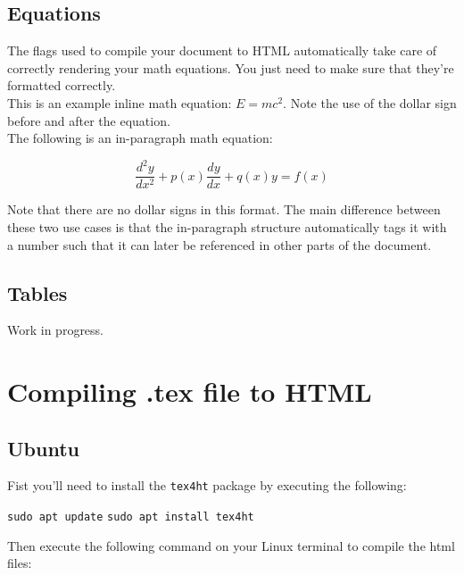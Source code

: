 \documentclass[lang=en]{article}
\newcommand{\code}[1]{\colorbox{light-gray}{\texttt{#1}}}
\begin{document}
\subsection{Equations}

The flags used to compile your document to HTML automatically take care of
correctly rendering your math equations. You just need to make sure that they're
formatted correctly. \\

This is an example inline math equation: $E=mc^2$. Note the use of the dollar
sign before and after the equation. \\

The following is an in-paragraph math equation:

\begin{equation}
  \frac{d^2y}{dx^2} + p(x) \frac{dy}{dx} + q(x)y = f(x)
\end{equation}

Note that there are no dollar signs in this format. The main difference between
these two use cases is that the in-paragraph structure automatically tags it
with a number such that it can later be referenced in other parts of the
document.


\subsection{Tables}

Work in progress.


\section{Compiling .tex file to HTML}
\label{sec:Compiling .tex file to HTML}

\subsection{Ubuntu}

Fist you'll need to install the \code{tex4ht} package by executing the
following:

\code{sudo apt update}
\code{sudo apt install tex4ht}

Then execute the following command on your Linux terminal to compile the html
files:
\end{document}
